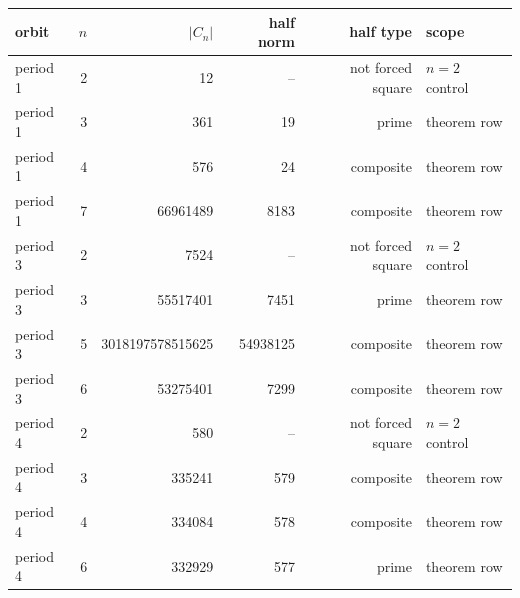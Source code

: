 \begin{tabular}{lrrrrl}
\toprule
orbit & $n$ & $|C_n|$ & half norm & half type & scope \\
\midrule
period 1 & 2 & 12 & -- & not forced square & $n=2$ control \\
period 1 & 3 & 361 & 19 & prime & theorem row \\
period 1 & 4 & 576 & 24 & composite & theorem row \\
period 1 & 7 & 66961489 & 8183 & composite & theorem row \\
period 3 & 2 & 7524 & -- & not forced square & $n=2$ control \\
period 3 & 3 & 55517401 & 7451 & prime & theorem row \\
period 3 & 5 & 3018197578515625 & 54938125 & composite & theorem row \\
period 3 & 6 & 53275401 & 7299 & composite & theorem row \\
period 4 & 2 & 580 & -- & not forced square & $n=2$ control \\
period 4 & 3 & 335241 & 579 & composite & theorem row \\
period 4 & 4 & 334084 & 578 & composite & theorem row \\
period 4 & 6 & 332929 & 577 & prime & theorem row \\
\bottomrule
\end{tabular}
